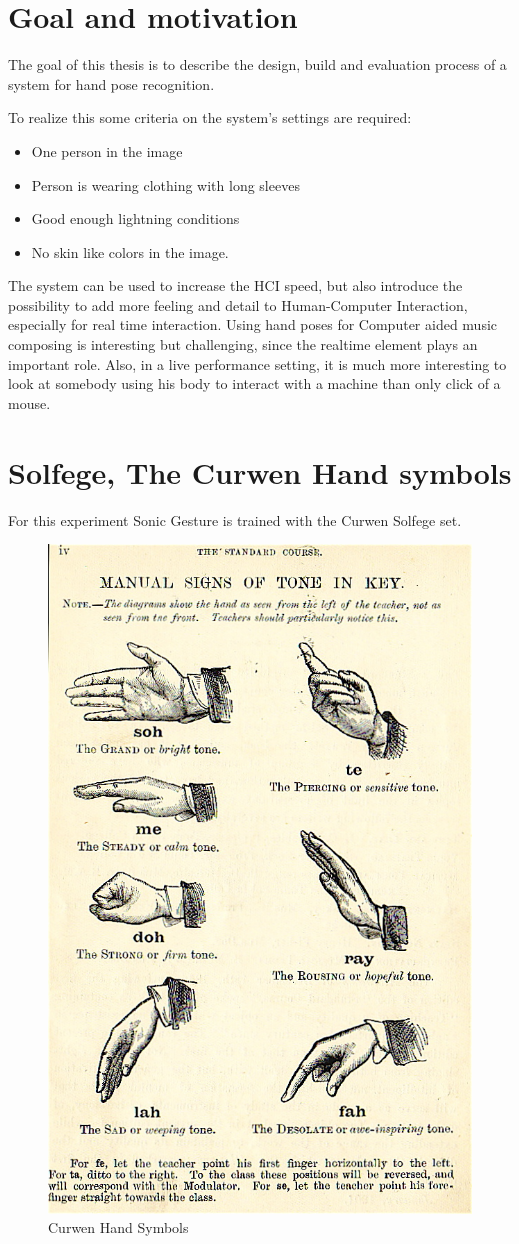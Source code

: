\section{Goal and motivation}
The goal of this thesis is to describe the design, build and evaluation process of a system for hand pose recognition.

To realize this some criteria on the system's settings are required:
\begin{itemize}
	\item One person in the image
	\item Person is wearing clothing with long sleeves
	\item Good enough lightning conditions
	\item No skin like colors in the image.
\end{itemize}

The system can be used to increase the HCI speed, but also introduce the possibility to add more feeling and detail to Human-Computer Interaction, especially for real time interaction. Using hand poses for Computer aided music composing is interesting but challenging, since the realtime element plays an important role. Also, in a live performance setting, it is much more interesting to look at somebody using his body to interact with a machine than only click of a mouse.


\section{Solfege, The Curwen Hand symbols}


For this experiment Sonic Gesture is trained with the Curwen Solfege set\cite{choksy1999}.


\begin{figure}[htbp]
	\center{}
	\label{fig:curwen}
	\includegraphics[width=0.3\linewidth]{figures/curwen.jpg}
	\caption{Curwen Hand Symbols}
\end{figure}

